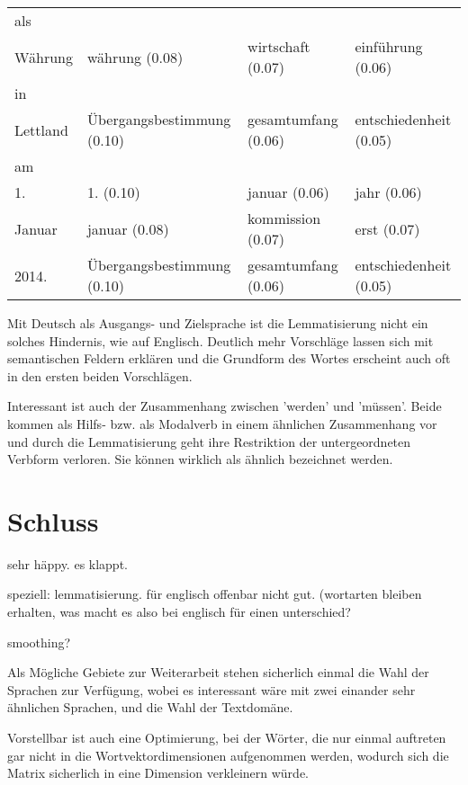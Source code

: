 \documentclass[11pt,twoside,openright]{mpreport}
\begin{document}
\begin{table}[H]
\begin{footnotesize}
\begin{tabular}{|llll|}
als & & & \\
Währung                & währung (0.08) & wirtschaft (0.07) & einführung (0.06) \\
in & & & \\
Lettland                & Übergangsbestimmung (0.10) & gesamtumfang (0.06) & entschiedenheit (0.05) \\
am & & & \\
1.                      & 1. (0.10) & januar (0.06) & jahr (0.06) \\
Januar                  & januar (0.08) & kommission (0.07) & erst (0.07) \\
2014.                   & Übergangsbestimmung (0.10) & gesamtumfang (0.06) & entschiedenheit (0.05) \\
\hline
\end{tabular}\end{footnotesize}
\label{Kandidaten DE (10k, Lemmata)}
\end{table}

Mit Deutsch als Ausgangs- und Zielsprache ist die Lemmatisierung nicht ein solches Hindernis, wie auf Englisch. Deutlich mehr Vorschläge lassen sich mit semantischen Feldern erklären und die Grundform des Wortes erscheint auch oft in den ersten beiden Vorschlägen.

Interessant ist auch der Zusammenhang zwischen 'werden' und 'müssen'. Beide kommen als Hilfs- bzw. als Modalverb in einem ähnlichen Zusammenhang vor und durch die Lemmatisierung geht ihre Restriktion der untergeordneten Verbform verloren. Sie können wirklich als ähnlich bezeichnet werden.

\chapter{Schluss}
\label{cha:schluss}

sehr häppy. es klappt. 

speziell: lemmatisierung. für englisch offenbar nicht gut. (wortarten bleiben erhalten, was macht es also bei englisch für einen unterschied?

smoothing?


Als Mögliche Gebiete zur Weiterarbeit stehen sicherlich einmal die Wahl der Sprachen zur Verfügung, wobei es interessant wäre mit zwei einander sehr ähnlichen Sprachen, und die Wahl der Textdomäne.

Vorstellbar ist auch eine Optimierung, bei der Wörter, die nur einmal auftreten gar nicht in die Wortvektordimensionen aufgenommen werden, wodurch sich die Matrix sicherlich in eine Dimension verkleinern würde.
\end{document}
